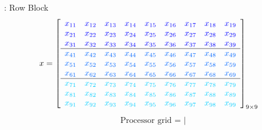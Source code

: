 \begin{frame}
\begin{exampleblock}{:  Row Block}
\begin{align*}
x &= \left[
      \begin{array}{lllllllll}
      \color{g11}x_{11} & \color{g11}x_{12} & \color{g11}x_{13} & 
\color{g11}x_{14} & \color{g11}x_{15} & \color{g11}x_{16} & \color{g11}x_{17} & 
\color{g11}x_{18} & \color{g11}x_{19}\\
      \color{g11}x_{21} & \color{g11}x_{22} & \color{g11}x_{23} & 
\color{g11}x_{24} & \color{g11}x_{25} & \color{g11}x_{26} & \color{g11}x_{27} & 
\color{g11}x_{28} & \color{g11}x_{29}\\
      \color{g11}x_{31} & \color{g11}x_{32} & \color{g11}x_{33} & 
\color{g11}x_{34} & \color{g11}x_{35} & \color{g11}x_{36} & \color{g11}x_{37} & 
\color{g11}x_{38} & \color{g11}x_{39}\\\hline
      \color{g12}x_{41} & \color{g12}x_{42} & \color{g12}x_{43} & 
\color{g12}x_{44} & \color{g12}x_{45} & \color{g12}x_{46} & \color{g12}x_{47} & 
\color{g12}x_{48} & \color{g12}x_{49}\\
      \color{g12}x_{51} & \color{g12}x_{52} & \color{g12}x_{53} & 
\color{g12}x_{54} & \color{g12}x_{55} & \color{g12}x_{56} & \color{g12}x_{57} & 
\color{g12}x_{58} & \color{g12}x_{59}\\
      \color{g12}x_{61} & \color{g12}x_{62} & \color{g12}x_{63} & 
\color{g12}x_{64} & \color{g12}x_{65} & \color{g12}x_{66} & \color{g12}x_{67} & 
\color{g12}x_{68} & \color{g12}x_{69}\\\hline
      \color{g13}x_{71} & \color{g13}x_{72} & \color{g13}x_{73} & 
\color{g13}x_{74} & \color{g13}x_{75} & \color{g13}x_{76} & \color{g13}x_{77} & 
\color{g13}x_{78} & \color{g13}x_{79}\\
      \color{g13}x_{81} & \color{g13}x_{82} & \color{g13}x_{83} & 
\color{g13}x_{84} & \color{g13}x_{85} & \color{g13}x_{86} & \color{g13}x_{87} & 
\color{g13}x_{88} & \color{g13}x_{89}\\
      \color{g13}x_{91} & \color{g13}x_{92} & \color{g13}x_{93} & 
\color{g13}x_{94} & \color{g13}x_{95} & \color{g13}x_{96} & \color{g13}x_{97} & 
\color{g13}x_{98} & \color{g13}x_{99}\\
      \end{array}
\right]_{9\times 9}
\end{align*}
\vspace{-.6cm}
\begin{align*}
\text{Processor grid = }\left|

\end{align*}
\end{exampleblock}
\end{frame}
